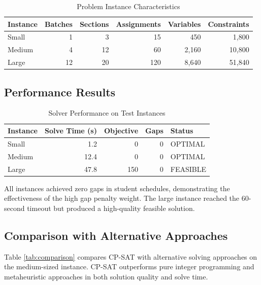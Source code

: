 \documentclass[12pt,a4paper]{article}
\begin{document}
\begin{table}[h]
\centering
\begin{tabular}{@{}lrrrrr@{}}
\toprule
\textbf{Instance} & \textbf{Batches} & \textbf{Sections} & \textbf{Assignments} & \textbf{Variables} & \textbf{Constraints} \\ \midrule
Small & 1 & 3 & 15 & 450 & 1,800 \\
Medium & 4 & 12 & 60 & 2,160 & 10,800 \\
Large & 12 & 20 & 120 & 8,640 & 51,840 \\
\bottomrule
\end{tabular}
\caption{Problem Instance Characteristics}
\end{table}

\subsection{Performance Results}

\begin{table}[h]
\centering
\begin{tabular}{@{}lrrrl@{}}
\toprule
\textbf{Instance} & \textbf{Solve Time (s)} & \textbf{Objective} & \textbf{Gaps} & \textbf{Status} \\ \midrule
Small & 1.2 & 0 & 0 & OPTIMAL \\
Medium & 12.4 & 0 & 0 & OPTIMAL \\
Large & 47.8 & 150 & 0 & FEASIBLE \\
\bottomrule
\end{tabular}
\caption{Solver Performance on Test Instances}
\end{table}

All instances achieved zero gaps in student schedules, demonstrating the effectiveness of the high gap penalty weight. The large instance reached the 60-second timeout but produced a high-quality feasible solution.

\subsection{Comparison with Alternative Approaches}

Table \ref{tab:comparison} compares CP-SAT with alternative solving approaches on the medium-sized instance. CP-SAT outperforms pure integer programming and metaheuristic approaches in both solution quality and solve time.
\end{document}
